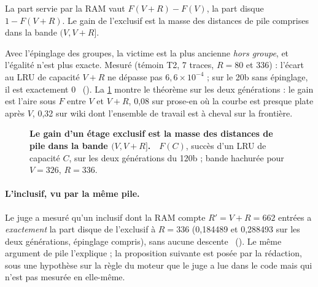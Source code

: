 \begin{corollaire}\label{t3mim:cor:bande}
La part servie par la RAM vaut $F(V+R) - F(V)$, la part disque $1 - F(V+R)$. Le gain de l'exclusif est la masse des distances de pile comprises dans la bande $(V, V+R]$.
\end{corollaire}

Avec l'épinglage des groupes, la victime est la plus ancienne \emph{hors groupe}, et l'égalité n'est plus exacte. Mesuré (témoin T2, 7 traces, $R = 80$ et 336) : l'écart au LRU de capacité $V+R$ ne dépasse pas $6{,}6 \times 10^{-4}$ ; sur le 20b sans épinglage, il est exactement 0 \mes~(). La \cref{fig:t3-mim-p2-pile} montre le théorème sur les deux générations : le gain est l'aire sous $F$ entre $V$ et $V+R$, 0,08 sur prose-en où la courbe est presque plate après $V$, 0,32 sur wiki dont l'ensemble de travail est à cheval sur la frontière.

\begin{figure}[tbp]
\centering
{}
\caption[P2 : les distances de pile et la bande $(V, V+R\rbrack$]{\textbf{Le gain d'un étage exclusif est la masse des distances de pile dans la bande $(V, V+R]$.} \mes\,\calc~$F(C)$, succès d'un LRU de capacité $C$, sur les deux générations du 120b ; bande hachurée pour $V = 326$, $R = 336$. \HorsStyle{}}
\label{fig:t3-mim-p2-pile}
\end{figure}

\paragraph{L'inclusif, vu par la même pile.} Le juge a mesuré qu'un inclusif dont la RAM compte $R' = V + R = 662$ entrées a \emph{exactement} la part disque de l'exclusif à $R = 336$ (0,184489 et 0,288493 sur les deux générations, épinglage compris), sans aucune descente \mes~(). Le même argument de pile l'explique ; la proposition suivante est posée par la rédaction, sous une hypothèse sur la règle du moteur que le juge a lue dans le code mais qui n'est pas mesurée en elle-même.

